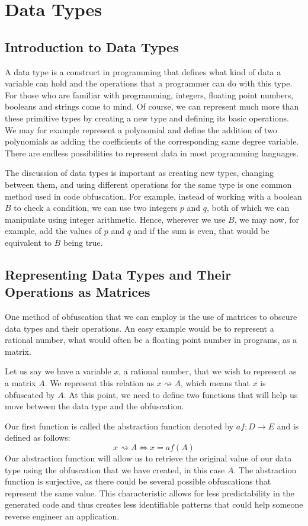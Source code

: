 \section{Data Types}
\subsection{Introduction to Data Types}
A data type is a construct in programming that defines what kind of data a
variable can hold and the operations that a programmer can do with this type.
For those who are familiar with programming, integers, floating point numbers,
booleans and strings come to mind. Of course, we can represent much more than
these primitive types by creating a new type and defining its basic
operations. We may for example represent a polynomial and define the addition
of two polynomials as adding the coefficients of the corresponding
same degree variable. There are endless possibilities to represent data in
most programming languages.

The discussion of data types is important as creating new types, changing
between them, and using different operations for the same type is one common
method used in code obfuscation. For example, instead of working with a boolean
$ B $ to check a condition, we can use two integers $ p $ and $ q $, both of
which we can manipulate using integer arithmetic. Hence, wherever we use $ B $,
we may now, for example, add the values of $ p $ and $ q $ and if the sum is
even, that would be equivalent to $ B $ being true.

\subsection{Representing Data Types and Their Operations as Matrices}
One method of obfuscation that we can employ is the use of matrices to obscure
data types and their operations. An easy example would be to represent a
rational number, what would often be a floating point number in programs, as a
matrix.

Let us say we have a variable $ x $, a rational number, that we wish to
represent as a matrix $ A $. We represent this relation as $ x \rightsquigarrow
A $, which means that $ x $ is obfuscated by $ A $. At this point, we need to
define two functions that will help us move between the data type and the
obfuscation.

Our first function is called the abstraction function denoted by $ af: D \to E
$ and is
defined as follows:
\begin{equation*}
    x \rightsquigarrow A \Leftrightarrow x = af (A)
\end{equation*}
Our abstraction function will allow us to retrieve the original value of our
data type using the obfuscation that we have created, in this case $ A $. The
abstraction function is surjective, as there could be several possible
obfuscations that represent the same value. This characteristic allows for less
predictability in the generated code and thus creates less identifiable
patterns that could help someone reverse engineer an application.

